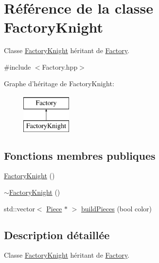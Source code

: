 \hypertarget{class_factory_knight}{\section{Référence de la classe Factory\-Knight}
\label{class_factory_knight}
}


Classe \hyperlink{class_factory_knight}{Factory\-Knight} héritant de \hyperlink{class_factory}{Factory}.  




{\ttfamily \#include $<$Factory.\-hpp$>$}

Graphe d'héritage de Factory\-Knight\-:\begin{figure}[H]
\begin{center}
\leavevmode
\includegraphics[height=2.000000cm]{class_factory_knight}
\end{center}
\end{figure}
\subsection*{Fonctions membres publiques}
\begin{DoxyCompactItemize}
\item 
\hyperlink{class_factory_knight_a4c3de6c385f4b3d02286e39cdbf99136}{Factory\-Knight} ()
\item 
\hyperlink{class_factory_knight_a40846bdf0be3fb8ecbcb50df3c4a7f61}{$\sim$\-Factory\-Knight} ()
\item 
std\-::vector$<$ \hyperlink{class_piece}{Piece} $\ast$ $>$ \hyperlink{class_factory_knight_a25af606063189d96698aae45b1bfc1b9}{build\-Pieces} (bool color)
\end{DoxyCompactItemize}


\subsection{Description détaillée}
Classe \hyperlink{class_factory_knight}{Factory\-Knight} héritant de \hyperlink{class_factory}{Factory}. 


